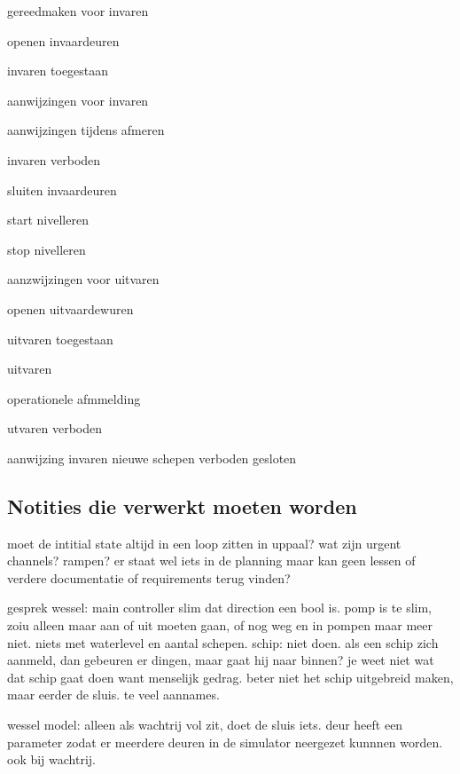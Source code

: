 {{{{{{{{{\begin{itemize}
\begin{minipage}{0.4\linewidth}
\end{minipage}
\begin{minipage}{0.4\linewidth}

\item gereedmaken voor invaren
\item openen invaardeuren
\item invaren toegestaan
\item aanwijzingen voor invaren
\item aanwijzingen tijdens afmeren
\item invaren verboden
\item sluiten invaardeuren
\item start nivelleren
\item stop nivelleren
\item aanzwijzingen voor uitvaren
\item openen uitvaardewuren
\item uitvaren toegestaan

\end{minipage}
\begin{minipage}{0.4\linewidth}
\item uitvaren
\item operationele afmmelding
\item utvaren verboden
\item aanwijzing invaren nieuwe schepen
\invaren verboden
\deuren gesloten
\end{minipage}
\end{itemize}


\subsection{Notities die verwerkt moeten worden}

moet de intitial state altijd in een loop zitten in uppaal?
wat zijn urgent channels?
rampen? er staat wel iets in de planning maar kan geen lessen of verdere documentatie of requirements terug vinden?	


gesprek wessel:
main controller slim dat direction een bool is. 
pomp is te slim, zoiu alleen maar aan of uit moeten gaan, of nog weg en in pompen maar meer niet. niets met waterlevel en aantal schepen.
schip: niet doen. als een schip zich aanmeld, dan gebeuren er dingen, maar gaat hij naar binnen? je weet niet wat dat schip gaat doen want menselijk gedrag. beter niet het schip uitgebreid maken, maar eerder de sluis. te veel aannames.

wessel model: alleen als wachtrij vol zit, doet de sluis iets.
deur heeft een parameter zodat er meerdere deuren in de simulator neergezet kunnnen worden. ook bij wachtrij.

}}}}}}}}}

